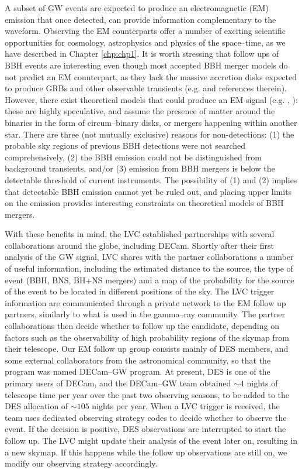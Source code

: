 A subset of GW events are expected to produce an electromagnetic (EM) emission that once detected, can provide information complementary to the waveform. Observing the EM counterparts offer a number of exciting scientific opportunities for cosmology, astrophysics and physics of the space--time, as we have described in Chapter \ref{chp:chp1}. It is worth stressing that follow ups of BBH events are interesting even though most accepted BBH merger models do not predict an EM counterpart, as they lack the massive accretion disks expected to produce GRBs and other observable transients (e.g. \citealt{2016arXiv160909517A} and references therein). However, there exist theoretical models that could produce an EM signal (e.g. \citealt{loeb}, \citealt{demink}): these are highly speculative, and assume the presence of matter around the binaries in the form of circum--binary disks, or mergers happening within another star. There are three (not mutually exclusive) reasons for non-detections: (1) the probable sky regions of previous BBH detections were not searched comprehensively, (2) the BBH emission could not be distinguished from background transients, and/or (3) emission from BBH mergers is below the detectable threshold of current instruments. The possibility of (1) and (2) implies that detectable BBH emission cannot yet be ruled out, and placing upper limits on the emission provides interesting constraints on theoretical models of BBH mergers.

With these benefits in mind, the LVC established partnerships with several collaborations around the globe, including DECam. Shortly after their first analysis of the GW signal, LVC shares with the partner collaborations a number of useful information, including the estimated distance to the source, the type of event (BBH, BNS, BH+NS mergers) and a map of the probability for the source of the event to be located in different positions of the sky. The LVC trigger information are communicated through a private network to the EM follow up partners, similarly to what is used in the gamma--ray community. The partner collaborations then decide whether to follow up the candidate, depending on factors such as the observability of high probability regions of the skymap from their telescope. Our EM follow up group consists mainly of DES members, and some external collaborators from the astronomical community, so that the program was named DECam--GW program. At present, DES is one of the primary users of DECam, and the DECam--GW team obtained $\sim 4$ nights of telescope time per year over the past two observing seasons, to be added to the DES allocation of $\sim 105$ nights per year. When a LVC trigger is received, the team uses dedicated observing strategy codes to decide whether to observe the event. If the decision is positive, DES observations are interrupted to start the follow up. The LVC might update their analysis of the event later on, resulting in a new skymap. If this happens while the follow up observations are still on, we modify our observing strategy accordingly.

